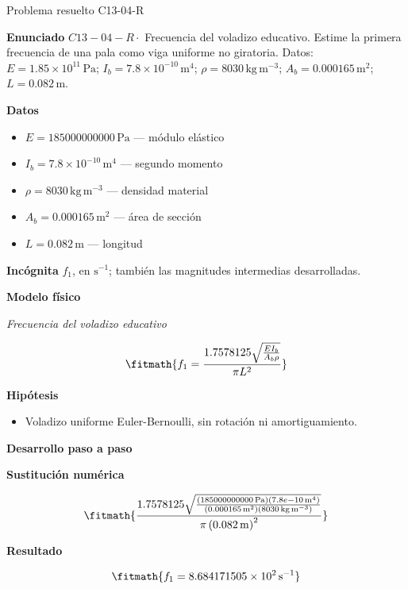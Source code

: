 \documentclass[10pt,openany]{book}
\begin{document}
\begin{studiumworked}{Problema resuelto C13-04-R}


\noindent\textbf{Enunciado}
\(C13-04-R \cdot\) Frecuencia del voladizo educativo. Estime la primera frecuencia de una pala como viga uniforme no giratoria. Datos: \(E=1.85\times 10^{11}\, \mathrm{Pa}\); \(I_b=7.8\times 10^{-10}\, \mathrm{m}^{4}\); \(\rho=8030\, \mathrm{kg}\,\mathrm{m}^{-3}\); \(A_b=0.000165\, \mathrm{m}^{2}\); \(L=0.082\, \mathrm{m}\).

\noindent\textbf{Datos}
\begin{itemize}
\item $E = 185000000000\,\mathrm{Pa}$ — módulo elástico
\item $I_b = 7.8\times 10^{-10}\,\mathrm{m}^{4}$ — segundo momento
\item $\rho = 8030\,\mathrm{kg}\,\mathrm{m}^{-3}$ — densidad material
\item $A_b = 0.000165\,\mathrm{m}^{2}$ — área de sección
\item $L = 0.082\,\mathrm{m}$ — longitud
\end{itemize}

\noindent\textbf{Incógnita}
$f_1$, en $\mathrm{s^{-1}}$; también las magnitudes intermedias desarrolladas.

\noindent\textbf{Modelo físico}

\noindent\textit{Frecuencia del voladizo educativo}

\[
\fitmath{f_1=\frac{1.7578125 \sqrt{\frac{E I_b}{A_b \rho}}}{\pi L^{2}}}
\]

\noindent\textbf{Hipótesis}
\begin{itemize}
\item Voladizo uniforme Euler-Bernoulli, sin rotación ni amortiguamiento.
\end{itemize}

\noindent\textbf{Desarrollo paso a paso}



\noindent\textbf{Sustitución numérica}

\[
\fitmath{\frac{1.7578125 \sqrt{\frac{\left(185000000000\,\mathrm{Pa}\right) \left(7.8e-10\,\mathrm{m}^{4}\right)}{\left(0.000165\,\mathrm{m}^{2}\right) \left(8030\,\mathrm{kg}\,\mathrm{m}^{-3}\right)}}}{\pi \left(0.082\,\mathrm{m}\right)^{2}}}
\]

\noindent\textbf{Resultado}

\[
\fitmath{f_1=8.684171505\times10^{2}\,\mathrm{s}^{-1}}
\]


\end{studiumworked}
\end{document}
